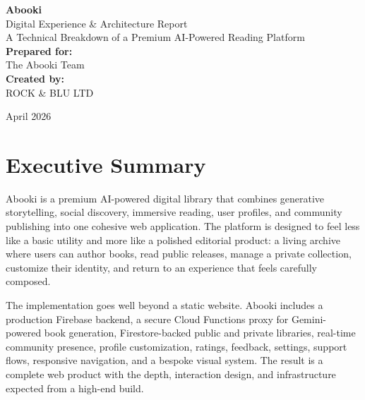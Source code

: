 \documentclass[11pt, a4paper]{article}
\begin{document}
\pagecolor{abookiblack}
\color{abookipaper}

\begin{titlepage}
    \centering
    \vspace*{4cm}

    {\Huge \bfseries \textcolor{abookigold}{Abooki}}\\[1cm]
    {\LARGE Digital Experience \& Architecture Report}\\[0.5cm]
    {\large A Technical Breakdown of a Premium AI-Powered Reading Platform}\\[3cm]

    {\large \textbf{Prepared for:}}\\[0.2cm]
    {\large The Abooki Team}\\[2cm]

    {\large \textbf{Created by:}}\\[0.2cm]
    {\large ROCK \& BLU LTD}\\[2cm]

    \vfill

    {\large April 2026}\\[1cm]
\end{titlepage}


\section{Executive Summary}
Abooki is a premium AI-powered digital library that combines generative storytelling, social discovery, immersive reading, user profiles, and community publishing into one cohesive web application. The platform is designed to feel less like a basic utility and more like a polished editorial product: a living archive where users can author books, read public releases, manage a private collection, customize their identity, and return to an experience that feels carefully composed.

The implementation goes well beyond a static website. Abooki includes a production Firebase backend, a secure Cloud Functions proxy for Gemini-powered book generation, Firestore-backed public and private libraries, real-time community presence, profile customization, ratings, feedback, settings, support flows, responsive navigation, and a bespoke visual system. The result is a complete web product with the depth, interaction design, and infrastructure expected from a high-end build.
\end{document}
